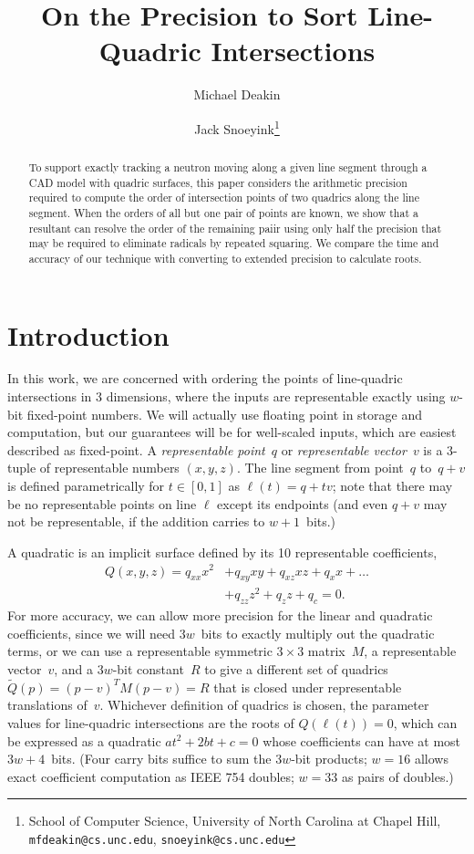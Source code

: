 \documentclass{cccg16}
\title{On the Precision to Sort Line-Quadric Intersections}
\author{Michael Deakin \and Jack Snoeyink\thanks{School of Computer
    Science, University of North Carolina at Chapel Hill, {\tt
      mfdeakin@cs.unc.edu}, {\tt snoeyink@cs.unc.edu}}}
\begin{document}
\thispagestyle{empty}
\maketitle

\begin{abstract}
  To support exactly tracking a neutron
  moving along a given line segment through a CAD model with quadric
  surfaces,  this paper considers the arithmetic precision required
  to compute the order of intersection points of two quadrics along the line segment. When the orders of all but one pair of points are known, we show that a resultant can
  resolve the order of the remaining paiir using only half the precision that may be
  required to eliminate radicals by repeated squaring. We compare
  the time and accuracy of our technique with converting to extended
  precision to calculate roots.
\end{abstract}


\section{Introduction}
In this work, we are concerned with ordering the points of
line-quadric intersections in 3 dimensions, where the inputs are
representable exactly using $w$-bit fixed-point numbers.  We will
actually use floating point in storage and computation, but our
guarantees will be for well-scaled inputs, which are easiest described
as fixed-point.  A {\it representable point}~$q$ or {\it representable
  vector}~$v$ is a $3$-tuple of representable numbers $(x, y, z)$. The
line segment from point~$q$ to~$q+v$ is defined parametrically for
$t\in [0,1]$ as $\ell(t)=q+tv$; note that there may be no
representable points on line $\ell$ except its endpoints (and even
$q+v$ may not be representable, if the addition carries to
$w+1$~bits.)

A quadratic is an implicit surface defined by its 10 representable coefficients,
\begin{align*}Q(x, y, z)=q_{xx} x^2 &+ q_{xy} xy + q_{xz} xz + q_x x + \dots \\
&+ q_{zz} z^2 + q_{z} z + q_c = 0.
\end{align*}
For more accuracy, we can allow more precision for the linear and
quadratic coefficients, since we will need $3w$~bits to exactly
multiply out the quadratic terms, or we can use a representable
symmetric $3\times 3$ matrix~$M$, a representable vector~$v$, and a
$3w$-bit constant~$R$ to give a different set of quadrics $\tilde Q(p)
= (p-v)^TM(p-v) = R$ that is closed under representable
translations of~$v$. Whichever definition of quadrics is chosen, the parameter
values for line-quadric intersections are the roots of $Q(\ell(t))=0$,
which can be expressed as a quadratic $at^2+2bt+c=0$ whose
coefficients can have at most $3w+4$~bits.  (Four carry bits suffice
to sum the $3w$-bit products; $w=16$ allows exact coefficient
computation as IEEE 754 doubles; $w=33$ as pairs of doubles.)
\end{document}
